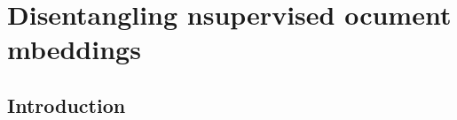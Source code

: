 \chapter{Disentangling nsupervised ocument mbeddings}\label{ch3}


\section{Introduction}\label{chapter3:Introduction}












